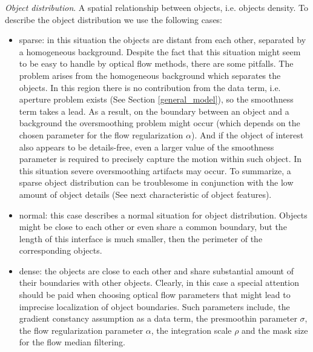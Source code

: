 \noindent \textit{Object distribution}. A spatial relationship between objects, i.e. objects density. To describe the object distribution we use the following cases:
\begin{itemize}
	\item sparse: in this situation the objects are distant from each other, separated by a homogeneous background.  Despite the fact that this situation might seem to be easy to handle by optical flow methods, there are some pitfalls. The problem arises from the homogeneous background which separates the objects. In this region there is no contribution from the data term, i.e. aperture problem exists (See Section \ref{general_model}), so the smoothness term takes a lead. As a result, on the boundary between an  object and a background the oversmoothing problem might occur (which depends on the chosen parameter for the flow regularization $\alpha$). And if the object of interest also appears to be details-free, even a larger value of the smoothness parameter is required to precisely capture the motion within such object. In this situation severe oversmoothing artifacts may occur. To summarize, a sparse object distribution can be troublesome in conjunction with the low amount of object details (See next characteristic of object features).
	
	\item normal: this case describes a normal situation for object distribution. Objects might be close to each other or even share a common boundary, but the length of this interface is much smaller, then the perimeter of the corresponding objects. 
	
	\item dense: the objects are close to each other and share substantial amount of their boundaries with other objects. Clearly, in this case a special attention should be paid when choosing optical flow parameters that might lead to imprecise localization of object boundaries. Such parameters include, the gradient constancy assumption as a data term, the presmoothin parameter $\sigma$, the flow regularization parameter $\alpha$, the integration scale $\rho$ and the mask size for the flow median filtering.  
\end{itemize}


